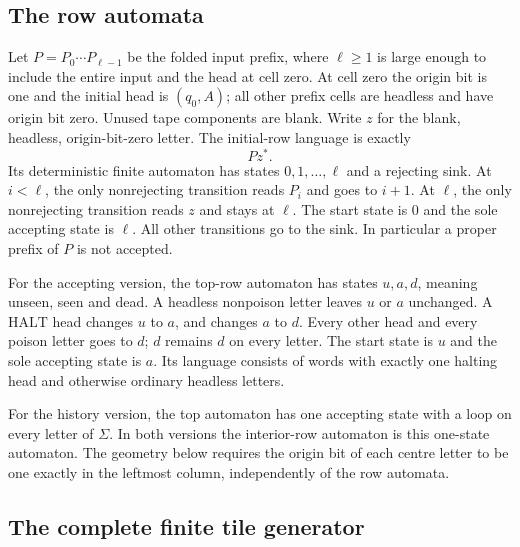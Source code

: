 \documentclass[11pt,reqno]{amsart}
\numberwithin{equation}{section}
\theoremstyle{definition}
\theoremstyle{remark}
\begin{document}
\subsection{The row automata}
\label{appcomp:automata}

Let $P=P_0\cdots P_{\ell-1}$ be the folded input prefix, where
$\ell\geq1$ is large enough to include the entire input and the head at
cell zero.  At cell zero the origin bit is one and the initial head is
$(q_0,A)$; all other prefix cells are headless and have origin bit zero.
Unused tape components are blank.  Write $z$ for the blank, headless,
origin-bit-zero letter.  The initial-row language is exactly
\begin{equation}
\label{appcomp:bottomlanguage}
Pz^* .
\end{equation}
Its deterministic finite automaton has states
$0,1,\ldots,\ell$ and a rejecting sink.  At $i<\ell$, the only
nonrejecting transition reads $P_i$ and goes to $i+1$.  At $\ell$, the
only nonrejecting transition reads $z$ and stays at $\ell$.  The start
state is $0$ and the sole accepting state is $\ell$.  All other
transitions go to the sink.  In particular a proper prefix of $P$ is
not accepted.

For the accepting version, the top-row automaton has states
$u,a,d$, meaning unseen, seen and dead.  A headless nonpoison letter
leaves $u$ or $a$ unchanged.  A $\mathrm{HALT}$ head changes $u$ to $a$,
and changes $a$ to $d$.  Every other head and every poison letter goes
to $d$; $d$ remains $d$ on every letter.  The start state is $u$ and
the sole accepting state is $a$.  Its language consists of words with
exactly one halting head and otherwise ordinary headless letters.

For the history version, the top automaton has one accepting state
with a loop on every letter of $\Sigma$.  In both versions the
interior-row automaton is this one-state automaton.  The geometry
below requires the origin bit of each centre letter to be one exactly
in the leftmost column, independently of the row automata.

\subsection{The complete finite tile generator}
\label{appcomp:tiles}
\end{document}
